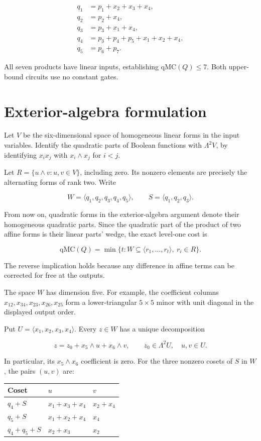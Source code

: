 \[\begin{aligned}
q_1&=p_1+x_2+x_3+x_4,\\
q_2&=p_2+x_4,\\
q_3&=p_3+x_1+x_4,\\
q_4&=p_3+p_4+p_5+x_1+x_2+x_4,\\
q_5&=p_6+p_7.
\end{aligned}\]

All seven products have linear inputs, establishing $\mathrm{qMC}(Q)\le7$. Both upper-bound circuits use no constant gates.

\section{Exterior-algebra formulation}

Let $V$ be the six-dimensional space of homogeneous linear forms in the input variables. Identify the quadratic parts of Boolean functions with $\Lambda^2 V$, by identifying $x_ix_j$ with $x_i\wedge x_j$ for $i<j$.

Let $R=\{u\wedge v:u,v\in V\}$, including zero. Its nonzero elements are precisely the alternating forms of rank two. Write

\[W=\langle q_1,q_2,q_3,q_4,q_5\rangle,\qquad
S=\langle q_1,q_2,q_3\rangle.\]

From now on, quadratic forms in the exterior-algebra argument denote their homogeneous quadratic parts. Since the quadratic part of the product of two affine forms is their linear parts' wedge, the exact level-one cost is

\[\mathrm{qMC}(Q)=
\min\{t:W\subseteq\langle r_1,\ldots,r_t\rangle,\ r_i\in R\}.\]

The reverse implication holds because any difference in affine terms can be corrected for free at the outputs.

The space $W$ has dimension five. For example, the coefficient columns $x_{12},x_{34},x_{23},x_{26},x_{25}$ form a lower-triangular $5\times5$ minor with unit diagonal in the displayed output order.

Put $U=\langle x_1,x_2,x_3,x_4\rangle$. Every $z\in W$ has a unique decomposition

\[z=z_0+x_5\wedge u+x_6\wedge v,\qquad z_0\in\Lambda^2 U,\quad u,v\in U.\]

In particular, its $x_5\wedge x_6$ coefficient is zero. For the three nonzero cosets of $S$ in $W$, the pairs $(u,v)$ are:

\begin{center}\begin{tabular}{lll}\toprule
Coset & $u$ & $v$\\\midrule
$q_4+S$ & $x_1+x_3+x_4$ & $x_2+x_4$\\
$q_5+S$ & $x_1+x_2+x_4$ & $x_4$\\
$q_4+q_5+S$ & $x_2+x_3$ & $x_2$\\
\bottomrule\end{tabular}\end{center}

